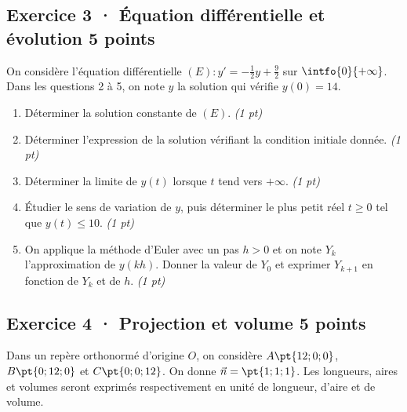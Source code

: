 \mxnewpage{}

\subsection*{Exercice 3 · Équation différentielle et évolution \hfill 5 points}On considère l'équation différentielle $(E):y'=-\frac1{2}y+\frac{9}{2}$ sur $\intfo{0}{+\infty}$. Dans les questions 2 à 5, on note $y$ la solution qui vérifie $y(0)=14$.

\begin{enumerate}

\item Déterminer la solution constante de $(E)$. \hfill\textit{(1 pt)}

\item Déterminer l'expression de la solution vérifiant la condition initiale donnée. \hfill\textit{(1 pt)}

\item Déterminer la limite de $y(t)$ lorsque $t$ tend vers $+\infty$. \hfill\textit{(1 pt)}

\item Étudier le sens de variation de $y$, puis déterminer le plus petit réel $t\ge0$ tel que $y(t)\le10$. \hfill\textit{(1 pt)}

\item On applique la méthode d'Euler avec un pas $h>0$ et on note $Y_k$ l'approximation de $y(kh)$. Donner la valeur de $Y_0$ et exprimer $Y_{k+1}$ en fonction de $Y_k$ et de $h$. \hfill\textit{(1 pt)}

\end{enumerate}

\subsection*{Exercice 4 · Projection et volume \hfill 5 points}Dans un repère orthonormé d'origine $O$, on considère $A\pt{12;0;0}$, $B\pt{0;12;0}$ et $C\pt{0;0;12}$. On donne $\vec n=\pt{1;1;1}$. Les longueurs, aires et volumes seront exprimés respectivement en unité de longueur, d'aire et de volume.

